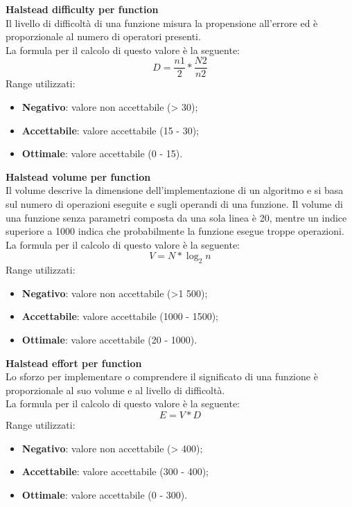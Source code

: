 \documentclass[../PianoDiQualifica.tex]{subfiles}
\begin{document}
				\textbf{Halstead difficulty per function}\\
				Il livello di difficoltà di una funzione misura la propensione all'errore ed è proporzionale al numero di operatori presenti.\\
				La formula per il calcolo di questo valore è la seguente:
				\begin{equation*}
					D = \frac{n1}{2} * \frac{N2}{n2}
				\end{equation*}
				Range utilizzati:
				\begin{itemize}
					\item \textbf{Negativo}: valore non accettabile (> 30);
					\item \textbf{Accettabile}: valore accettabile (15 - 30);
					\item \textbf{Ottimale}: valore accettabile (0 - 15).\\
				\end{itemize}

				\textbf{Halstead volume per function}\\
				Il volume descrive la dimensione dell'implementazione di un algoritmo e si basa sul numero di operazioni eseguite e sugli operandi di una funzione. Il volume di una funzione senza parametri composta da una sola linea è 20, mentre un indice superiore a 1000 indica che probabilmente la funzione esegue troppe operazioni.
				\\La formula per il calcolo di questo valore è la seguente:
				\begin{equation*}
					V = N * \log_{2}{n}
				\end{equation*}
				Range utilizzati:
				\begin{itemize}
					\item \textbf{Negativo}: valore non accettabile (>1 500);
					\item \textbf{Accettabile}: valore accettabile (1000 - 1500);
					\item \textbf{Ottimale}: valore accettabile (20 - 1000).
				\end{itemize}

				\textbf{Halstead effort per function}\\
				Lo sforzo per implementare o comprendere il significato di una funzione è proporzionale al suo volume e al livello di difficoltà.
				\\La formula per il calcolo di questo valore è la seguente:
				\begin{equation*}
					E = V * D
				\end{equation*}
				Range utilizzati:
				\begin{itemize}
					\item \textbf{Negativo}: valore non accettabile (> 400);
					\item \textbf{Accettabile}: valore accettabile (300 - 400);
					\item \textbf{Ottimale}: valore accettabile (0 - 300).
				\end{itemize}
\end{document}
